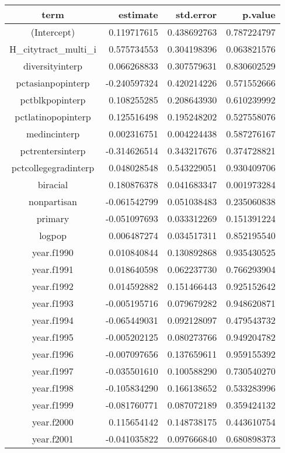 \documentclass[]{article}
\begin{document}
\begin{longtable}{crrr}
\toprule
term & estimate & std.error & p.value \\ 
\midrule
(Intercept) & 0.119717615 & 0.438692763 & 0.787224797 \\ 
H\_citytract\_multi\_i & 0.575734553 & 0.304198396 & 0.063821576 \\ 
diversityinterp & 0.066268833 & 0.307579631 & 0.830602529 \\ 
pctasianpopinterp & -0.240597324 & 0.420214226 & 0.571552666 \\ 
pctblkpopinterp & 0.108255285 & 0.208643930 & 0.610239992 \\ 
pctlatinopopinterp & 0.125516498 & 0.195248202 & 0.527558076 \\ 
medincinterp & 0.002316751 & 0.004224438 & 0.587276167 \\ 
pctrentersinterp & -0.314626514 & 0.343217676 & 0.374728821 \\ 
pctcollegegradinterp & 0.048028548 & 0.543229051 & 0.930409706 \\ 
biracial & 0.180876378 & 0.041683347 & 0.001973284 \\ 
nonpartisan & -0.061542799 & 0.051038483 & 0.235060838 \\ 
primary & -0.051097693 & 0.033312269 & 0.151391224 \\ 
logpop & 0.006487274 & 0.034517311 & 0.852195540 \\ 
year.f1990 & 0.010840844 & 0.130892868 & 0.935430525 \\ 
year.f1991 & 0.018640598 & 0.062237730 & 0.766293904 \\ 
year.f1992 & 0.014592882 & 0.151466443 & 0.925152642 \\ 
year.f1993 & -0.005195716 & 0.079679282 & 0.948620871 \\ 
year.f1994 & -0.065449031 & 0.092128097 & 0.479543732 \\ 
year.f1995 & -0.005202125 & 0.080273766 & 0.949204782 \\ 
year.f1996 & -0.007097656 & 0.137659611 & 0.959155392 \\ 
year.f1997 & -0.035501610 & 0.100588290 & 0.730540270 \\ 
year.f1998 & -0.105834290 & 0.166138652 & 0.533283996 \\ 
year.f1999 & -0.081760771 & 0.087072189 & 0.359424132 \\ 
year.f2000 & 0.115654142 & 0.148738175 & 0.443610754 \\ 
year.f2001 & -0.041035822 & 0.097666840 & 0.680898373 \\ 

\end{longtable}
\end{document}
